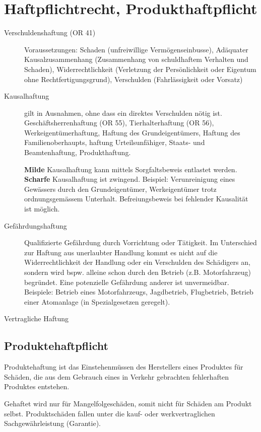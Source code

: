 \chapter{Haftpflichtrecht, Produkthaftpflicht}
\begin{description}
  \item[Verschuldenshaftung (OR 41)] Voraussetzungen: Schaden (unfreiwillige Vermögenseinbusse), Adäquater Kausalzusammenhang (Zusammenhang von schuldhaftem Verhalten und Schaden), Widerrechtlichkeit (Verletzung der Persönlichkeit oder Eigentum ohne Rechtfertigungsgrund), Verschulden (Fahrlässigkeit oder Vorsatz)
  
  \item[Kausalhaftung] gilt in Ausnahmen, ohne dass ein direktes Verschulden nötig ist. Geschäftsherrenhaftung (OR 55), Tierhalterhaftung (OR 56), Werkeigentümerhaftung, Haftung des Grundeigentümers, Haftung des Familienoberhaupts, haftung Urteilsunfähiger, Staats- und Beamtenhaftung, Produkthaftung.
  
  \textbf{Milde} Kausalhaftung kann mittels Sorgfaltsbeweis entlastet werden. 
  \textbf{Scharfe} Kausalhaftung ist zwingend. Beispiel: Verunreinigung eines Gewässers durch den Grundeigentümer, Werkeigentümer trotz ordnungsgemässem Unterhalt. Befreiungsbeweis bei fehlender Kausalität ist möglich.
  
  \item[Gefährdungshaftung] Qualifizierte Gefährdung durch Vorrichtung oder Tätigkeit. Im Unterschied zur Haftung aus unerlaubter Handlung kommt es nicht auf die Widerrechtlichkeit der Handlung oder ein Verschulden des Schädigers an, sondern wird bspw. alleine schon durch den Betrieb (z.B. Motorfahrzeug) begründet. Eine potenzielle Gefährdung anderer ist unvermeidbar. Beispiele: Betrieb eines Motorfahrzeugs, Jagdbetrieb, Flugbetrieb, Betrieb einer Atomanlage (in Spezialgesetzen geregelt).
  
  \item[Vertragliche Haftung]
\end{description}

\section{Produktehaftpflicht}
Produktehaftung ist das Einstehenmüssen des Herstellers eines Produktes für Schäden, die aus dem Gebrauch eines in Verkehr gebrachten fehlerhaften Produktes entstehen.

Gehaftet wird nur für Mangelfolgeschäden, somit nicht für Schäden am Produkt selbst. Produktschäden fallen unter die kauf- oder werkvertraglichen Sachgewährleistung (Garantie).
\vspace{3mm}


